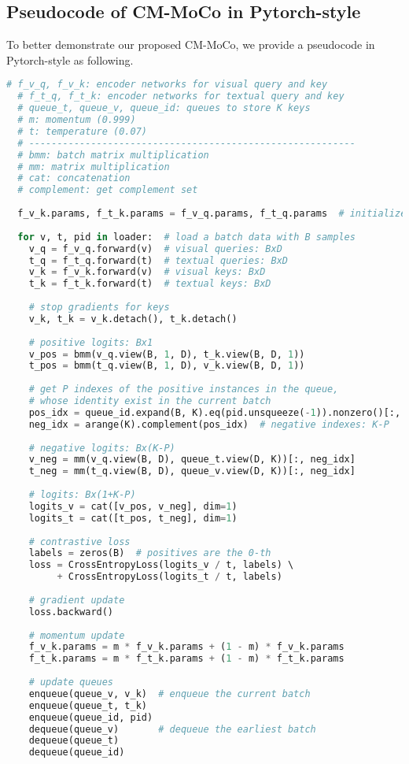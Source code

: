\documentclass{bmvc2k}
\begin{document}
\subsection{Pseudocode of CM-MoCo in Pytorch-style} To better demonstrate our proposed CM-MoCo, we provide a pseudocode in Pytorch-style as following.

\begin{lstlisting}[language=python]
  # f_v_q, f_v_k: encoder networks for visual query and key
  # f_t_q, f_t_k: encoder networks for textual query and key
  # queue_t, queue_v, queue_id: queues to store K keys
  # m: momentum (0.999)
  # t: temperature (0.07)
  # ----------------------------------------------------------
  # bmm: batch matrix multiplication
  # mm: matrix multiplication
  # cat: concatenation
  # complement: get complement set
  
  f_v_k.params, f_t_k.params = f_v_q.params, f_t_q.params  # initialize
  
  for v, t, pid in loader:  # load a batch data with B samples
    v_q = f_v_q.forward(v)  # visual queries: BxD
    t_q = f_t_q.forward(t)  # textual queries: BxD
    v_k = f_v_k.forward(v)  # visual keys: BxD
    t_k = f_t_k.forward(t)  # textual keys: BxD
    
    # stop gradients for keys
    v_k, t_k = v_k.detach(), t_k.detach()
    
    # positive logits: Bx1
    v_pos = bmm(v_q.view(B, 1, D), t_k.view(B, D, 1))
    t_pos = bmm(t_q.view(B, 1, D), v_k.view(B, D, 1))
    
    # get P indexes of the positive instances in the queue,
    # whose identity exist in the current batch
    pos_idx = queue_id.expand(B, K).eq(pid.unsqueeze(-1)).nonzero()[:, 1]
    neg_idx = arange(K).complement(pos_idx)  # negative indexes: K-P
    
    # negative logits: Bx(K-P)
    v_neg = mm(v_q.view(B, D), queue_t.view(D, K))[:, neg_idx]
    t_neg = mm(t_q.view(B, D), queue_v.view(D, K))[:, neg_idx]
    
    # logits: Bx(1+K-P)
    logits_v = cat([v_pos, v_neg], dim=1)
    logits_t = cat([t_pos, t_neg], dim=1)
    
    # contrastive loss
    labels = zeros(B)  # positives are the 0-th
    loss = CrossEntropyLoss(logits_v / t, labels) \ 
         + CrossEntropyLoss(logits_t / t, labels)
    
    # gradient update
    loss.backward()
    
    # momentum update
    f_v_k.params = m * f_v_k.params + (1 - m) * f_v_k.params
    f_t_k.params = m * f_t_k.params + (1 - m) * f_t_k.params
    
    # update queues
    enqueue(queue_v, v_k)  # enqueue the current batch
    enqueue(queue_t, t_k)
    enqueue(queue_id, pid)
    dequeue(queue_v)       # dequeue the earliest batch
    dequeue(queue_t)
    dequeue(queue_id)
\end{lstlisting}
\end{document}
